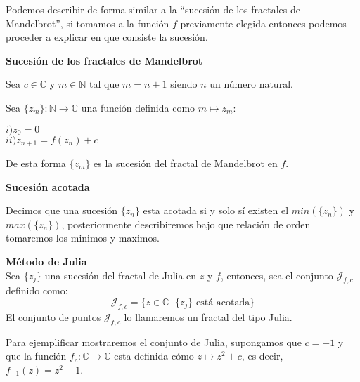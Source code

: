 \documentclass{article}
\begin{document}
{\begin{itemize}
{            Podemos describir de forma similar a la ``sucesión de los fractales de Mandelbrot'', si tomamos a la función $f$ previamente elegida entonces podemos proceder a explicar en que consiste la sucesión.

            \textbf{Sucesión de los fractales de Mandelbrot}

            Sea $c\in\mathbb{C}$ y $m\in\mathbb{N}$ tal que $m=n+1$ siendo $n$ un número natural.

            Sea $\{z_m\}:\mathbb{N}\rightarrow\mathbb{C}$ una función definida como $m\mapsto z_m$:

            \hspace*{0,5cm}$i)  z_0 =  0$\\
            \hspace*{1cm}$ii) z_{n+1} = f(z_n)+c$

            De esta forma $\{z_m\}$ es la sucesión del fractal de Mandelbrot en $f$.

            \textbf{Sucesión acotada}

            Decimos que una sucesión $\{z_n\}$ esta acotada si y solo sí existen el $min(\{z_n\})$ y $max(\{z_n\})$, posteriormente describiremos bajo que relación de orden tomaremos los minimos y maximos.


            \textbf{Método de Julia}\\
            Sea $\{z_j\}$ una sucesión del fractal de Julia en $z$ y $f$, entonces, sea el conjunto $\mathcal{J}_{f,c}$ definido como:
            $$\mathcal{J}_{f,c} = \{ z\in\mathbb{C} \,|\, \{z_j\} \mbox{ está acotada}\}$$
            El conjunto de puntos $\mathcal{J}_{f,c}$ lo llamaremos un fractal del tipo Julia.
            \vspace{0,1mm}
            
            Para ejemplificar mostraremos el conjunto de Julia, supongamos que $c=-1$ y que la función $f_c:\mathbb{C}\rightarrow\mathbb{C}$ esta definida cómo $z\mapsto z^2+c$, es decir, $f_{-1}(z)=z^2-1$.

}
\end{itemize}}
\end{document}
